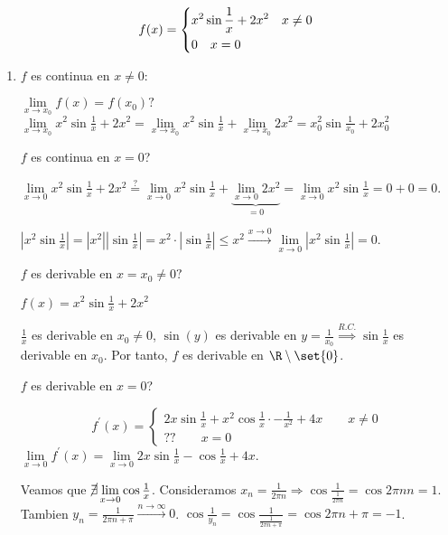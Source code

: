 \begin{example}
	\label{ejnocont}
	\[
		f(x) = \begin{dcases}
			x^{2} \sin \frac{1}{x} + 2x^{2} \quad x \neq 0 \\
			0 \quad x = 0
		\end{dcases}
	\]
	\begin{enumerate}
		\item \(f \) es continua en \(x \neq  0 \):

		      \(\lim\limits_{x  \to x_0 } f(x) = f(x_0)?\) \(\lim\limits_{x  \to x_0 } x^{2} \sin \frac{1}{x} + 2x^{2} = \lim\limits_{x  \to x_0 } x^{2} \sin \frac{1}{x} + \lim\limits_{x  \to x_0 } 2x^{2} =  x^{2}_0 \sin \frac{1}{x_0} + 	2x^{2}_0    \)

		      \(f \) es continua en \(x = 0\)?

		      \(\lim\limits_{x  \to 0 } x^{2} \sin \frac{1}{x} + 2x^{2} \overset{?}{=} \lim\limits_{x \to 0 } x^{2} \sin \frac{1}{x} + \underbrace{\lim\limits_{x  \to 0 } 2x^{2} }_{=0}= \lim\limits_{x  \to 0 } x^{2}\sin \frac{1}{x}  = 0 + 0 = 0  \).

		      \(\left\vert x^{2} \sin \frac{1}{x}  \right\vert = \left\vert x^{2}  \right\vert \left\vert \sin \frac{1}{x } \right\vert = x^{2} \cdot \left\vert \sin \frac{1}{x } \right\vert  \leq x^{2} \overset{x\rightarrow 0}{\longrightarrow} \lim\limits_{x  \to 0 } \left\vert x^{2} \sin \frac{1}{x }  \right\vert = 0  \).

		      \(f \) es derivable en \(x = x_0 \neq  0 ? \)

		      \(f(x) = x^{2} \sin \frac{1}{x} + 2x^{2}  \)

		      \(\frac{1}{x }\) es derivable en \(x_0 \neq 0 \), \(\sin (y )\) es derivable en \(y = \frac{1}{x_0 } \overset{R.C.}{\Rightarrow} \sin \frac{1}{x }\) es derivable en \(x_0 \).  Por tanto, \(f \) es derivable en \(\R \setminus \set{0 }\).

		      \(f \) es derivable en \(x = 0 \)?

		      \[
			      f^\prime (x) = \begin{cases}
				      2x \sin \frac{1}{x} + x^{2} \cos \frac{1}{x} \cdot - \frac{1}{x^{2} } + 4x \qquad x \neq 0 \\
				      ?? \qquad x = 0
			      \end{cases}
		      \]
		      \(\lim\limits_{x  \to 0 } f^\prime (x) = \lim\limits_{x  \to 0 } 2x \sin \frac{1}{x} - \cos \frac{1}{x} + 4x\).

		      Veamos que \(\cancel\exists \lim\limits_{x  \to 0 } \cos \frac{1}{x }\). Consideramos \(x_n = \frac{1}{2\pi n} \Rightarrow \cos \frac{1}{\frac{1}{2\pi n }} = \cos  2\pi n n = 1 \). Tambien \(y_n = \frac{1}{2\pi n + \pi } \overset{n \rightarrow \infty}{\longrightarrow} 0 \). \(\cos \frac{1}{y_n} = \cos \frac{1}{\frac{1}{2\pi n + \pi}} = \cos 2\pi n + \pi = -1\).


\end{enumerate}
\end{example}
